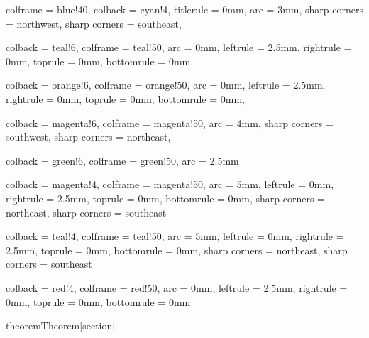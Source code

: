 
{
    colframe = blue!40,
    colback = cyan!4,
    titlerule = 0mm,
    arc = 3mm,
    sharp corners = northwest, 
    sharp corners = southeast,
}

{
    colback = teal!6,
    colframe = teal!50,
    arc = 0mm,
    leftrule = 2.5mm,
    rightrule = 0mm,
    toprule = 0mm,
    bottomrule = 0mm,
}

{
    colback = orange!6,
    colframe = orange!50,
    arc = 0mm,
    leftrule = 2.5mm,
    rightrule = 0mm,
    toprule = 0mm,
    bottomrule = 0mm,
}

{
    colback = magenta!6,
    colframe = magenta!50,
    arc = 4mm,
    sharp corners = southwest,
    sharp corners = northeast,
}

{
    colback = green!6,
    colframe = green!50,
    arc = 2.5mm
}

{
    colback = magenta!4,
    colframe = magenta!50,
    arc = 5mm,
    leftrule = 0mm,
    rightrule = 2.5mm,
    toprule = 0mm,
    bottomrule = 0mm,
    sharp corners = northeast,
    sharp corners = southeast
}

{
    colback = teal!4,
    colframe = teal!50,
    arc = 5mm,
    leftrule = 0mm,
    rightrule = 2.5mm,
    toprule = 0mm,
    bottomrule = 0mm,
    sharp corners = northeast,
    sharp corners = southeast
}

{
  colback = red!4,
  colframe = red!50,
  arc = 0mm,
  leftrule = 2.5mm,
  rightrule = 0mm,
  toprule = 0mm,
  bottomrule = 0mm
}

\newenvironment{soln}
{
    \vspace{0.1cm}
    \textit{Solution.}
}{$\hfill \blacksquare$}

\newenvironment{prf}
{
    \textit{Proof.}
}{$\hfill \blacksquare$}

\newenvironment{soln-container}
{
    \vspace{0.1cm}
}

\newtheorem{theorem}{Theorem}[section]
\newtheorem{corollary}{Corollary}[theorem]
\newtheorem{clm}[theorem]{Claim}
\newtheorem{propn}[theorem]{Proposition}

\theoremstyle{remark}

\theoremstyle{definition}
\newtheorem{prob}{Problem}
\newtheorem{examples}[theorem]{Example}
\newtheorem{counterexample}[theorem]{Counter Example}
\newtheorem{definition}{Definition}[section]

